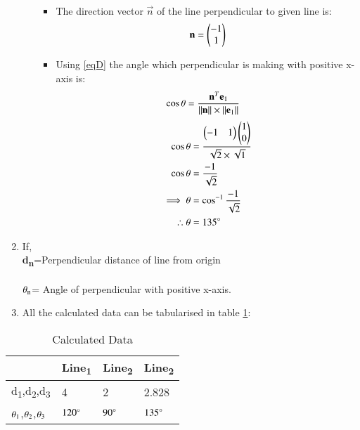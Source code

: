 \documentclass[journal,12pt,twocolumn]{IEEEtran}
\begin{document}
\begin{enumerate}
\begin{enumerate}[label=\alph*.]
\begin{itemize}
\begin{align}
\end{align}
\item The direction vector $\vec{n}$ of the line perpendicular to given line is: 
\begin{align}
    \mathbf{n}=\begin{pmatrix}-1\\1\end{pmatrix}
\end{align}
\item Using \eqref{eqD} the angle which perpendicular is making with positive x-axis is:
\begin{align}
   \cos\theta&= \frac{\mathbf{n}^T\mathbf{e\textsubscript{1}}}{\lVert\mathbf{n}\rVert\times\lVert\mathbf{e\textsubscript{1}}\rVert}
    \end{align}
    \begin{align}
   \cos\theta &= \frac{\begin{pmatrix}-1&1\end{pmatrix}\begin{pmatrix}1\\0\end{pmatrix}}{\sqrt{2}\times\sqrt{1}}
    \\
 \cos\theta&= \frac{-1}{\sqrt{2}}
 \\
 \implies \theta&=\cos^{-1}\frac{-1}{\sqrt{2}}
 \\
 \therefore  \theta&=135\degree
\end{align}
\end{itemize}
\end{enumerate}
\item If,
\\
\textbf{d\textsubscript{n}}=Perpendicular distance of line from origin
\\
\\
$\theta\textsubscript{n}$= Angle of perpendicular with positive x-axis.
\item All the calculated data can be tabularised in table  \ref{tab:table2}:
\end{enumerate}
\begin{table}[!ht]
\begin{center}
\begin{tabular}{ | m{2cm} | m{1.2cm}| m{1.2cm} | m{1.2cm} |} 
\hline
 & Line\textsubscript{1} & Line\textsubscript{2} & Line\textsubscript{2} \\
\hline
d\textsubscript{1},d\textsubscript{2},d\textsubscript{3} & 4 & 2 & 2.828 \\ 
\hline
$\theta\textsubscript{1}$,$\theta\textsubscript{2}$,$\theta\textsubscript{3}$& $120\degree$ & $90\degree$ & $135\degree$ \\ 
\hline
\end{tabular}
\end{center}
\caption{Calculated Data}
\label{tab:table2}
\end{table}
\end{document}
